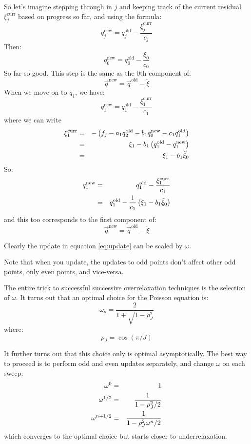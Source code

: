 So let's imagine stepping through in $j$ and keeping track of the
current residual $\xi_j^{\mathrm{curr}}$ based on progress so far, and using the
formula:
\begin{equation}
\label{eq:update}
q_j^{\mathrm{new}} = q_j^{\mathrm{old}}
- \frac{\xi_j^{\mathrm{curr}}}{c_j}
\end{equation}
Then:
\begin{equation}
q_0^{\mathrm{new}} = q_0^{\mathrm{old}} - \frac{\xi_0}{c_0}
\end{equation}
So far so good. This step is the same as the 0th component of:
\begin{equation}
\vec{q}^{\mathrm{new}} = \vec{q}^{\mathrm{old}}
- \tilde\xi
\end{equation}
When we move on to $q_1$, we have:
\begin{equation}
q_1^{\mathrm{new}} = q_1^{\mathrm{old}}
- \frac{\xi_1^{\mathrm{curr}}}{c_1}
\end{equation}
where we can write
\begin{eqnarray}
\xi_1^{\mathrm{curr}} &=& - \left(f_j - a_1 q_2^{\mathrm{old}} - b_1
q_0^{\mathrm{new}} - c_1 q_1^{\mathrm{old}}\right) \cr
&=& \xi_1 - b_1 \left(q_1^{\mathrm{old}} -
q_1^{\mathrm{new}}\right) \cr
&=& \xi_1 - b_1 \tilde\xi_0
\end{eqnarray}
So:
\begin{eqnarray}
q_1^{\mathrm{new}} &=& q_1^{\mathrm{old}}
- \frac{\xi_1^{\mathrm{curr}}}{c_1} \cr
&=& q_1^{\mathrm{old}} - \frac{1}{c_1} \left(\xi_1
- b_1 \tilde\xi_0\right)
\end{eqnarray}
and this too corresponds to the first component of: 
\begin{equation}
\vec{q}^{\mathrm{new}} = \vec{q}^{\mathrm{old}}
- \tilde\xi
\end{equation}

Clearly the update in equation \ref{eq:update} can be scaled by
$\omega$.

Note that when you update, the updates to odd points don't affect
other odd points, only even points, and vice-versa. 

The entire trick to successful successive overrelaxation techniques is
the selection of $\omega$. It turns out that an optimal choice for the
Poisson equation is:
\begin{equation}
\omega_{o} = \frac{2}{1+\sqrt{1-\rho_J^2}}
\end{equation}
where:
\begin{equation}
\rho_J = \cos(\pi/J)
\end{equation}

It further turns out that this choice only is optimal
asymptotically. The best way to proceed is to perform odd and even
updates separately, and change $\omega$ on each sweep:
\begin{eqnarray}
\omega^{0} &=& 1 \cr
\omega^{1/2} &=& \frac{1}{1-\rho_J^2 /2} \cr
\omega^{n+1/2} &=& \frac{1}{1-\rho_J^2 \omega^n /2} \cr
\end{eqnarray}
which converges to the optimal choice but starts closer to
underrelaxation. 
